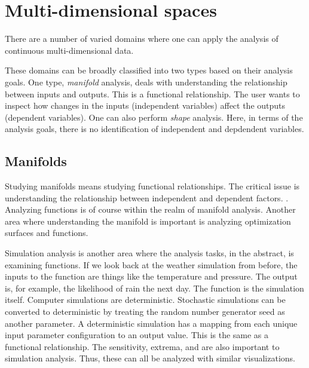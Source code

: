 
\section{Multi-dimensional spaces}
\label{sec:motivation:multi-d}

There are a number of varied domains where one can apply the analysis of
continuous multi-dimensional data.



These domains can be broadly classified into two types based on their analysis
goals. One type, \emph{manifold} analysis, deals with understanding the
relationship between inputs and outputs. This is a functional relationship.
The user wants to inspect how changes in the inputs (independent variables)
affect the outputs (dependent variables). One can also perform \emph{shape}
analysis. Here, in terms of the analysis goals, there is no identification of
independent and depdendent variables. 

\subsection{Manifolds}
\label{sec:manifolds}

Studying manifolds means studying functional relationships. The critical issue
is understanding the relationship between independent and dependent factors.
. Analyzing functions is of course within the realm of
manifold analysis.  Another area where understanding
the manifold is important is analyzing optimization surfaces and functions.
 

 Simulation analysis is another area where the analysis tasks,
in the abstract, is examining functions.  If we
look back at the weather simulation from before, the inputs to the function are
things like the temperature and pressure. The output is, for example, the
likelihood of rain the next day. The function is the simulation itself.
Computer simulations are deterministic. Stochastic simulations can be converted
to deterministic by treating the random number generator seed as another
parameter.  A deterministic simulation has a mapping from each unique input
parameter configuration to an output value. This is the same as a functional
relationship. The sensitivity, extrema, and  are also
important to simulation analysis. 
Thus, these can all be analyzed with similar visualizations.

